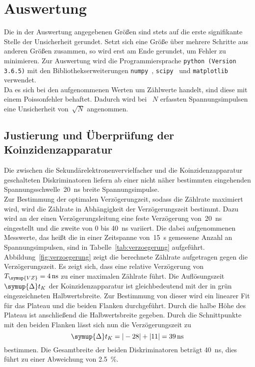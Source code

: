 \section{Auswertung}
\label{sec:auswertung}
Die in der Auswertung angegebenen Größen sind stets auf die erste signifikante
Stelle der Unsicherheit gerundet. Setzt sich eine Größe über mehrere Schritte aus
anderen Größen zusammen, so wird erst am Ende gerundet, um Fehler zu minimieren.
Zur Auswertung wird die Programmiersprache \texttt{python (Version 3.6.5)} mit
den Bibliothekserweiterungen \texttt{numpy}~\cite{numpy},
\texttt{scipy}~\cite{scipy} und \texttt{matplotlib}~\cite{matplotlib} verwendet.\\
\newline
Da es sich bei den aufgenommenen Werten um Zählwerte handelt, sind diese mit einem
Poissonfehler behaftet. Dadurch wird bei ~$N$ erfassten Spannungsimpulsen eine Unsicherheit
von~$\sqrt{N}$ angenommen.

\subsection{Justierung und Überprüfung der Koinzidenzapparatur}
Die zwischen die Sekundärelektronenvervielfacher und die Koinzidenzapparatur
geschalteten Diskriminatoren liefern ab einer nicht näher bestimmten eingehenden
Spannungsschwelle~\SI{20}{\nano\second} breite Spannungsimpulse.\\
\newline
Zur Bestimmung der optimalen Verzögerungzeit, sodass die Zählrate maximiert wird,
wird die Zählrate in Abhängigkeit der Verzögerungszeit bestimmt. Dazu wird an der
einen Verzögerungsleitung eine feste Verzögerung von~\SI{20}{\nano\second} eingestellt
und die zweite von $0$ bis \SI{40}{\nano\second} variiert.
Die dabei aufgenommenen Messwerte, das heißt die in einer Zeitspanne von~\SI{15}{\second}
gemessene Anzahl an Spannungsimpulsen, sind in Tabelle~\ref{tab:verzoegerung} aufgeführt.
Abbildung~\ref{fig:verzoegerung} zeigt die berechnete Zählrate aufgetragen gegen
die Verzögerungszeit. Es zeigt sich, dass eine relative Verzögerung
von~$T_{\symup{VZ}}=\SI{4}{\nano\second}$ zu einer maximalen Zählrate führt.
Die Auflösungszeit~$\symup{\Delta}t_K$ der Koinzidenzapparatur ist gleichbedeutend
mit der in grün eingezeichneten Halbwertsbreite. Zur Bestimmung von dieser wird
ein linearer Fit für das Plateau und die beiden Flanken durchgeführt. Durch die halbe
Höhe des Plateau ist anschließend die Halbwertsbreite gegeben. Durch die Schnittpunkte
mit den beiden Flanken lässt sich nun die Verzögerungszeit zu
\begin{equation}
  \symup{\Delta}t_K = |-28| + |11| = \SI{39}{\nano\second}
\end{equation}
bestimmen.
Die Gesamtbreite der beiden Diskriminatoren beträgt \SI{40}{\nano\second}, dies
führt zu einer Abweichung von \SI{2.5}{\percent}.

